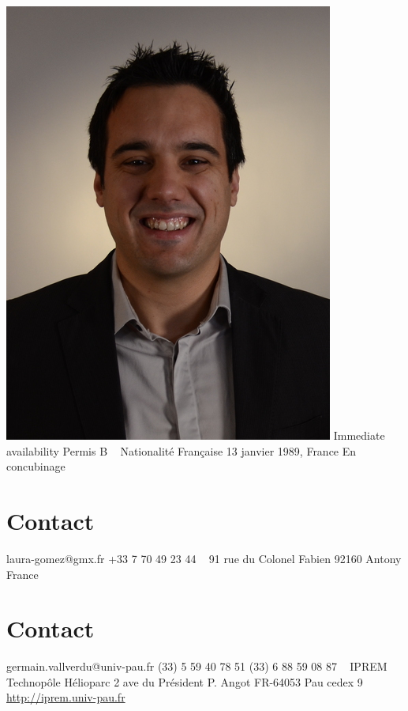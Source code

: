 \documentclass{cv-style}     %
\begin{document}


\begin{aside}
    \includegraphics[width=.8\columnwidth]{img/gvallver-red2}
    Immediate availability
    Permis B
    ~
    Nationalité Française
    13 janvier 1989, France
    En concubinage
    \section{Contact}
    laura-gomez@gmx.fr
    +33 7 70 49 23 44
    ~
    91 rue du Colonel Fabien
    92160 Antony
    France
    \section{Contact}
    germain.vallverdu@univ-pau.fr
    (33) 5 59 40 78 51
    (33) 6 88 59 08 87
    ~
    {\color{gray} \faFlask} IPREM
    Technopôle Hélioparc
    2 ave du Président P. Angot
    FR-64053 Pau cedex 9
    \href{http://iprem.univ-pau.fr/fr/index.html}{http://iprem.univ-pau.fr}

\end{aside}
\end{document}
